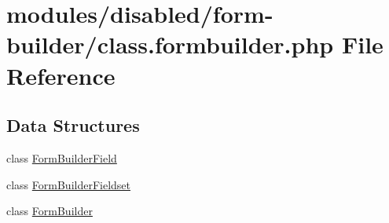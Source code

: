 \hypertarget{class_8formbuilder_8php}{\section{modules/disabled/form-\/builder/class.formbuilder.\-php File Reference}
\label{class_8formbuilder_8php}
}
\subsection*{Data Structures}
\begin{DoxyCompactItemize}
\item 
class \hyperlink{class_form_builder_field}{Form\-Builder\-Field}
\item 
class \hyperlink{class_form_builder_fieldset}{Form\-Builder\-Fieldset}
\item 
class \hyperlink{class_form_builder}{Form\-Builder}
\end{DoxyCompactItemize}
